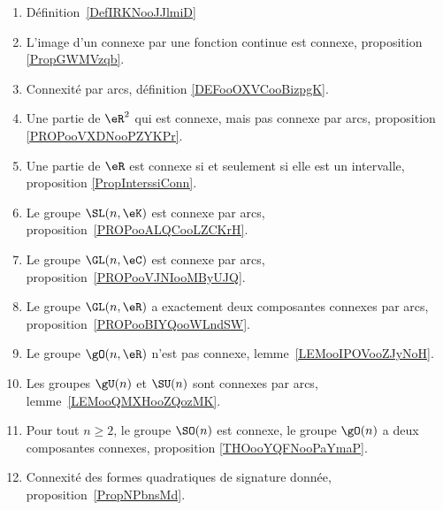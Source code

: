 
    \begin{enumerate}
        \item
            Définition~\ref{DefIRKNooJJlmiD}
        \item
            L'image d'un connexe par une fonction continue est connexe, proposition \ref{PropGWMVzqb}.
        \item
            Connexité par arcs, définition \ref{DEFooOXVCooBizpgK}.
        \item
            Une partie de \( \eR^2\) qui est connexe, mais pas connexe par arcs, proposition \ref{PROPooVXDNooPZYKPr}.
        \item
            Une partie de \( \eR\) est connexe si et seulement si elle est un intervalle, proposition \ref{PropInterssiConn}.
        \item
            Le groupe \( \SL(n,\eK)\) est connexe par arcs, proposition~\ref{PROPooALQCooLZCKrH}.
        \item
            Le groupe \( \GL(n,\eC)\) est connexe par arcs, proposition~\ref{PROPooVJNIooMByUJQ}.
        \item
            Le groupe \( \GL(n,\eR)\) a exactement deux composantes connexes par arcs, proposition~\ref{PROPooBIYQooWLndSW}.
        \item
            Le groupe \( \gO(n,\eR)\) n'est pas connexe, lemme~\ref{LEMooIPOVooZJyNoH}.
        \item
            Les groupes \( \gU(n)\) et \( \SU(n)\) sont connexes par arcs, lemme~\ref{LEMooQMXHooZQozMK}.
        \item
            Pour tout \( n\geq 2\), le groupe \( \SO(n)\) est connexe, le groupe \( \gO(n)\) a deux composantes connexes, proposition \ref{THOooYQFNooPaYmaP}.
        \item
            Connexité des formes quadratiques de signature donnée, proposition~\ref{PropNPbnsMd}.
        \end{enumerate}

